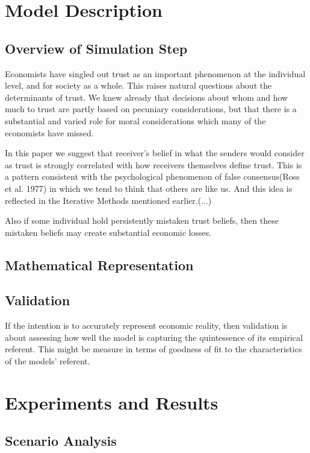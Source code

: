 \documentclass[11pt]{article}
\begin{document}
\section{Model Description}
\subsection{Overview of Simulation Step}

Economists have singled out trust as an important phenomenon at the individual level, and for society as a whole. This raises natural questions about the determinants of trust. We knew already that decisions about whom and how much to trust are partly based on pecuniary considerations, but that there is a substantial and varied role for moral considerations which many of the economists have missed.

In this paper we suggest that receiver's belief in what the senders would consider as trust is strongly correlated with how receivers themselves define trust. This is a pattern consistent with the psychological phenomenon of false consensus(Ross et al. 1977) in which we tend to think that others are like us. And this idea is reflected in the Iterative Methods mentioned earlier.(...)

Also if some individual hold persistently mistaken trust beliefs, then these mistaken beliefs may create substantial economic losses. 

  

\subsection{Mathematical Representation}
\subsection{Validation}

If the intention is to accurately represent economic reality, then validation is about assessing how well the model is capturing the quintessence of its empirical referent. This might be measure in terms of goodness of fit to the characteristics of the models' referent.
 


\section{Experiments and Results}
\subsection{Scenario Analysis}
\end{document}
